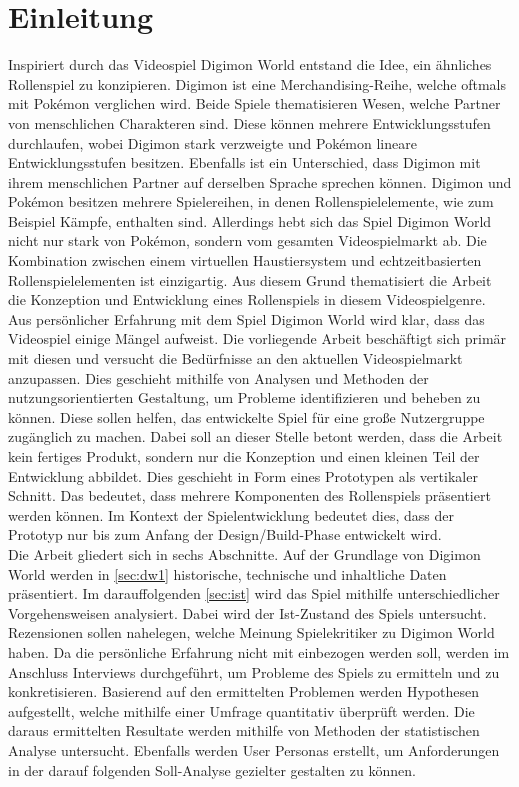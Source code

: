\section{Einleitung}
Inspiriert durch das Videospiel Digimon World entstand die Idee, ein ähnliches Rollenspiel zu konzipieren.
Digimon ist eine Merchandising-Reihe, welche oftmals mit Pokémon verglichen wird\cite{ign}\cite{digimon-reflections}.
Beide Spiele thematisieren Wesen, welche Partner von menschlichen Charakteren sind.
Diese können mehrere Entwicklungsstufen durchlaufen, wobei Digimon stark verzweigte und Pokémon lineare Entwicklungsstufen besitzen.
Ebenfalls ist ein Unterschied, dass Digimon mit ihrem menschlichen Partner auf derselben Sprache sprechen können.
Digimon und Pokémon besitzen mehrere Spielereihen, in denen Rollenspielelemente, wie zum Beispiel Kämpfe, enthalten sind.
Allerdings hebt sich das Spiel Digimon World nicht nur stark von Pokémon, sondern vom gesamten Videospielmarkt ab.
Die Kombination zwischen einem virtuellen Haustiersystem und echtzeitbasierten Rollenspielelementen ist einzigartig.
Aus diesem Grund thematisiert die Arbeit die Konzeption und Entwicklung eines Rollenspiels in diesem Videospielgenre. \\

Aus persönlicher Erfahrung mit dem Spiel Digimon World wird klar, dass das Videospiel einige Mängel aufweist.
Die vorliegende Arbeit beschäftigt sich primär mit diesen und versucht die Bedürfnisse an den aktuellen Videospielmarkt anzupassen.
Dies geschieht mithilfe von Analysen und Methoden der nutzungsorientierten Gestaltung, um Probleme identifizieren und beheben zu können.
Diese sollen helfen, das entwickelte Spiel für eine große Nutzergruppe zugänglich zu machen.
Dabei soll an dieser Stelle betont werden, dass die Arbeit kein fertiges Produkt, sondern nur die Konzeption und einen kleinen Teil der Entwicklung abbildet.
Dies geschieht in Form eines Prototypen als vertikaler Schnitt.
Das bedeutet, dass mehrere Komponenten des Rollenspiels präsentiert werden können.
Im Kontext der Spielentwicklung bedeutet dies, dass der Prototyp nur bis zum Anfang der Design/Build-Phase entwickelt wird\cite{game-user-research}.  \\

Die Arbeit gliedert sich in sechs Abschnitte.
Auf der Grundlage von Digimon World werden in \autoref{sec:dw1} historische, technische und inhaltliche Daten präsentiert.
Im darauffolgenden \autoref{sec:ist} wird das Spiel mithilfe unterschiedlicher Vorgehensweisen analysiert.
Dabei wird der Ist-Zustand des Spiels untersucht. Rezensionen sollen nahelegen, welche Meinung Spielekritiker zu Digimon World haben.
Da die persönliche Erfahrung nicht mit einbezogen werden soll, werden im Anschluss Interviews durchgeführt, um Probleme des Spiels zu ermitteln und zu konkretisieren.
Basierend auf den ermittelten Problemen werden Hypothesen aufgestellt, welche mithilfe einer Umfrage quantitativ überprüft werden.
Die daraus ermittelten Resultate werden mithilfe von Methoden der statistischen Analyse untersucht.
Ebenfalls werden User Personas erstellt, um Anforderungen in der darauf folgenden Soll-Analyse gezielter gestalten zu können.
\newpage

